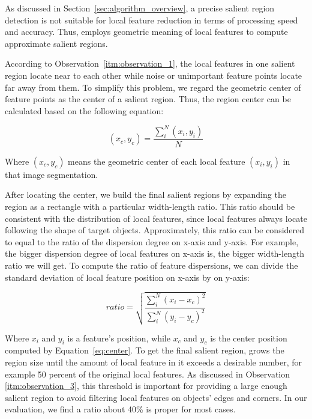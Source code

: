 As discussed in Section~\ref{sec:algorithm_overview}, a precise salient region detection is not suitable for local feature reduction in terms of processing speed and accuracy. Thus, {\sys} employs geometric meaning of local features to compute approximate salient regions.

According to Observation~\ref{itm:observation_1}, the local features in one salient region locate near to each other while noise or unimportant feature points locate far away from them. To simplify this problem, we regard the geometric center of feature points as the center of a salient region. Thus, the region center can be calculated based on the following equation:

{\begin{equation} \label{eq:center}
\left({x}_{c},{y}_{c} \right) = \frac{\sum_{i}^{N}\left({x}_{i},{y}_{i} \right)}{N}
\end{equation}}

Where $\left({x}_{c},{y}_{c} \right)$ means the geometric center of each local feature $\left({x}_{i},{y}_{i} \right)$ in that image segmentation.

After locating the center, we build the final salient regions by expanding the region as a rectangle with a particular width-length ratio. This ratio should be consistent with the distribution of local features, since local features always locate following the shape of target objects. Approximately, this ratio can be considered to equal to the ratio of the dispersion degree on x-axis and y-axis. For example, the bigger dispersion degree of local features on x-axis is, the bigger width-length ratio we will get. To compute the ratio of feature dispersions, we can divide the standard deviation of local feature position on x-axis by on y-axis:

{\begin{equation} \label{eq:ratio}
ratio = \sqrt{\frac{\sum_{i}^{N}\left ( x_{i}-x_{c} \right )^{2}}{\sum_{i}^{N}\left ( y_{i}-y_{c} \right )^{2}}}
\end{equation}}

Where $x_{i}$ and $y_{i}$ is a feature's position, while $x_{c}$ and $y_{c}$ is the center position computed by Equation~\ref{eq:center}. To get the final salient region, {\sys} grows the region size until the amount of local feature in it exceeds a desirable number, for example 50 percent of the original local features. As discussed in Observation \ref{itm:observation_3}, this threshold is important for providing a large enough salient region to avoid filtering local features on objects' edges and corners. In our evaluation, we find a ratio about 40\% is proper for most cases.

